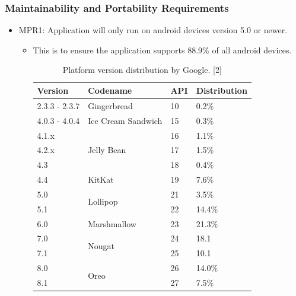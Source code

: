 \documentclass[]{article}
\begin{document}
\subsubsection{Maintainability and Portability Requirements}
\begin{itemize}
	\item MPR1: Application will only run on android devices version 5.0 or newer.
	\begin{itemize}
		\item This is to ensure the application supports 88.9\% of all android devices.
		\begin{table}[H]
		    \centering
            \begin{tabular}{|l|l|l|l|}
                \hline
                Version       & Codename                    & API & Distribution \\ \hline
                2.3.3 - 2.3.7 & Gingerbread                 & 10  & 0.2\%        \\ \hline
                4.0.3 - 4.0.4 & Ice Cream Sandwich          & 15  & 0.3\%        \\ \hline
                4.1.x         & \multirow{3}{*}{Jelly Bean} & 16  & 1.1\%        \\ \cline{1-1} \cline{3-4} 
                4.2.x         &                             & 17  & 1.5\%        \\ \cline{1-1} \cline{3-4} 
                4.3           &                             & 18  & 0.4\%        \\ \hline
                4.4           & KitKat                      & 19  & 7.6\%        \\ \hline
                5.0           & \multirow{2}{*}{Lollipop}   & 21  & 3.5\%        \\ \cline{1-1} \cline{3-4} 
                5.1           &                             & 22  & 14.4\%       \\ \hline
                6.0           & Marshmallow                 & 23  & 21.3\%       \\ \hline
                7.0           & \multirow{2}{*}{Nougat}     & 24  & 18.1         \\ \cline{1-1} \cline{3-4} 
                7.1           &                             & 25  & 10.1         \\ \hline
                8.0           & \multirow{2}{*}{Oreo}       & 26  & 14.0\%       \\ \cline{1-1} \cline{3-4} 
                8.1           &                             & 27  & 7.5\%        \\ \hline
            \end{tabular}
            \caption{Platform version distribution by Google. [2]}
        \end{table}
	\end{itemize}
\end{itemize}
\end{document}
